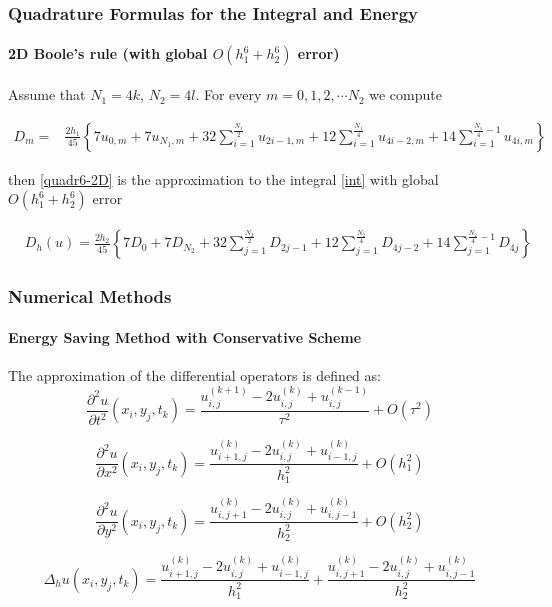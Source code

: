 \documentclass{beamer}
\begin{document}
\begin{frame}
\frametitle{Quadrature Formulas for the Integral and Energy}
\framesubtitle{2D Boole's rule (with global $O(h_1^6+h_2^6)$ error)}

Assume that $N_1=4k$, $N_2=4 l$.
For every $m=0,1,2,\cdots N_2$ we compute

\begin{align*}
D_m =& \frac{2h_1}{45} 
\left\{
7u_{0,m}+7u_{N_1,m}+32 \sum_{i=1}^{\frac{N_1}{2}}u_{2i-1,m}
+12\sum_{i=1}^{\frac{N_1}{4}}u_{4i-2,m}
+14 \sum_{i=1}^{\frac{N_1}{4}-1}u_{4i,m}
\right\}
\end{align*}

then \eqref{quadr6-2D} is the approximation to the integral \eqref{int} with global $O(h_1^6+h_2^6)$ error

\begin{align}\label{quadr6-2D}
&D_h(u) =
\frac{2h_2}{45} 
\left\{
7D_{0}+7D_{N_2}+32 \sum_{j=1}^{\frac{N_2}{2}}D_{2j-1}
+12\sum_{j=1}^{\frac{N_2}{4}}D_{4j-2}
+14 \sum_{j=1}^{\frac{N_2}{4}-1}D_{4j}
\right\}
\end{align}
\end{frame}


\begin{frame}
\frametitle{Numerical Methods}
\framesubtitle{Energy Saving Method with Conservative Scheme}

The approximation of the differential operators is defined as:
\begin{equation}
\frac{\partial^2 u}{\partial t^2}(x_i, y_j, t_k ) = \frac{ u^{(k+1)}_{i, j} - 2u^{(k)}_{i,j} + u^{(k-1)}_{i,j} }{\tau^2} + O(\tau^2) 
\end{equation}

\begin{equation}
\frac{\partial^2 u}{\partial x^2}(x_i, y_j, t_k ) = \frac{ u^{(k)}_{i+1, j} - 2u^{(k)}_{i,j} + u^{(k)}_{i-1,j} }{h_1^2} + O(h_1^2) 
\end{equation}

\begin{equation}
\frac{\partial^2 u}{\partial y^2}(x_i, y_j, t_k ) = \frac{ u^{(k)}_{i, j+1} - 2u^{(k)}_{i,j} + u^{(k)}_{i,j-1} }{h_2^2} + O(h_2^2) 
\end{equation}


\begin{equation}
\Delta_h u(x_i, y_j, t_k )  = \frac{ u^{(k)}_{i+1, j} - 2u^{(k)}_{i,j} + u^{(k)}_{i-1,j} }{h_1^2} + \frac{ u^{(k)}_{i, j+1} - 2u^{(k)}_{i,j} + u^{(k)}_{i,j-1} }{h_2^2}
\end{equation}

\end{frame}
\end{document}
